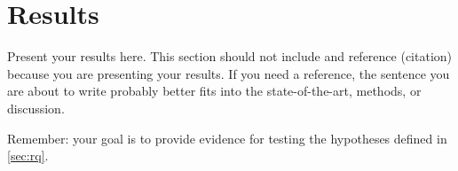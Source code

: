 \chapter{Results}
\label{ch:results}

Present your results here. This section should not include and reference (citation) because you are presenting your results. If you need a reference, the sentence you are about to write probably better fits into the state-of-the-art, methods, or discussion.

Remember: your goal is to provide evidence for testing the hypotheses defined in \autoref{sec:rq}.